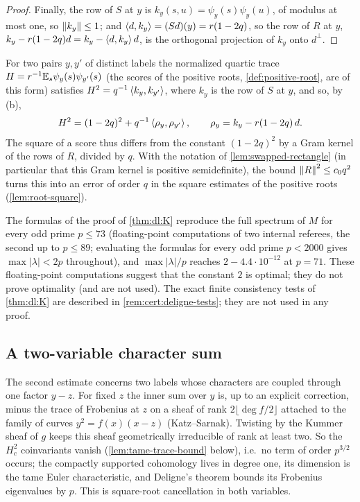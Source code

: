 \begin{proof}
Finally, the row of $S$ at $y$ is $k_y(s,u)=\psi_y(s)\psi_y(u)$, of modulus at
most one, so $\left\|k_y\right\|\le1$; and $\left\langle d,k_y\right\rangle=(Sd)(y)=r(1-2q)$, so the row of
$R$ at $y$, $k_y-r(1-2q)d=k_y-\left\langle d,k_y\right\rangle d$, is the orthogonal projection of
$k_y$ onto $d^\perp$.
\end{proof}

\noindent For two pairs $y,y'$ of distinct labels the normalized quartic trace
$H=r^{-1}\mathbb E_s\psi_y(s)\psi_{y'}(s)$ (the scores of the positive roots,
\cref{def:positive-root}, are of this form) satisfies $H^2=q^{-1}\left\langle k_y,k_{y'}\right\rangle$,
where $k_y$ is the row of $S$ at $y$, and so, by (b),
\[
 H^2=(1-2q)^2+q^{-1}\left\langle \rho_y,\rho_{y'}\right\rangle,\qquad\rho_y=k_y-r(1-2q)\,d .
\]
The square of a score thus differs from the constant $(1-2q)^2$ by a Gram kernel
of the rows of $R$, divided by $q$. With the notation of
\cref{lem:swapped-rectangle} (in particular that this Gram kernel
is positive semidefinite), the bound $\left\|R\right\|^2\le c_0q^2$ turns
this
into an error of order $q$ in the square estimates of the positive roots
(\cref{lem:root-square}).

\begin{remark}\label{rem:dl:K-sharp}
The formulas of the proof of \cref{thm:dl:K} reproduce the full spectrum of $M$ for every odd
prime $p\le73$ (floating-point computations of two internal referees, the
second up to $p\le89$; evaluating the formulas for every odd prime $p<2000$
gives $\max|\lambda|<2p$ throughout), and $\max|\lambda|/p$ reaches
$2-4.4\cdot10^{-12}$ at $p=71$. These floating-point computations suggest
that the constant $2$ is optimal; they do not prove optimality (and are
not used). The
exact finite consistency tests of \cref{thm:dl:K} are described in
\cref{rem:cert:deligne-tests}; they are not used in any proof.
\end{remark}



\subsection{A two-variable character sum}\label{subsec:dl:H2}

The second estimate concerns two labels whose characters are coupled through
one factor $y-z$. For fixed $z$ the inner sum over $y$ is, up to an explicit
correction, minus the trace of Frobenius at $z$ on a sheaf of rank
$2\lfloor\deg f/2\rfloor$ attached to the family of curves $y^2=f(x)(x-z)$
(Katz--Sarnak). Twisting by the Kummer sheaf of $g$ keeps this sheaf
geometrically irreducible of rank at least two. So the $H^2_c$ coinvariants vanish (\cref{lem:tame-trace-bound} below), i.e.\ no term of order $p^{3/2}$ occurs; the compactly supported cohomology lives in degree one, its
dimension is the tame Euler characteristic, and Deligne's theorem bounds its
Frobenius eigenvalues by $p$. This is square-root cancellation in both
variables.

